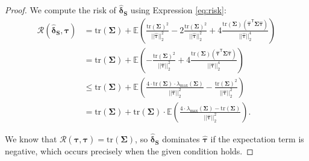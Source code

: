 \documentclass{article}
\newcommand{\bsSigma}{\boldsymbol \Sigma}
\newcommand{\bstau}{\boldsymbol \tau}
\newcommand{\hbstau}{\boldsymbol{\hat \tau}}
\newcommand{\bsSig}{\boldsymbol  \Sigma}
\def\E{\mathbb{E}}
\newcommand{\Tr}{\text{tr}}
\newcommand{\bsdelts}{\boldsymbol {\hat \delta_S}}
\newcommand{\tran}{\mathsf{T}}
\newcommand{\lambdamax}{\lambda_{\text{max}}(\bsSig)}
\begin{document}
\begin{proof}
We compute the risk of $\bsdelts$ using Expression \ref{eq:risk}:
\begin{align*}
\mathcal{R}\left( \bsdelts, \bstau \right) 
&=  \Tr(\bsSigma) + \E \left( \frac{\Tr(\bsSig)^2}{|| \hbstau||_2^2} - 2\frac{\Tr(\bsSig)^2}{|| \hbstau||_2^2} + 4 \frac{\Tr(\bsSig) \left(\hbstau^ \tran \bsSig \hbstau \right)}{||\hbstau||_2^4}   \right) \\
&=  \Tr(\bsSigma) + \E \left( - \frac{\Tr(\bsSig)^2}{|| \hbstau||_2^2} + 4 \frac{\Tr(\bsSig) \left(\hbstau^ \tran \bsSig \hbstau \right)}{||\hbstau||_2^4}   \right) \\
&\leq  \Tr(\boldsymbol \Sigma) + \E \left( \frac{4\cdot \Tr(\bsSig) \cdot\lambdamax}{|| \hbstau||_2^2}  - \frac{\Tr(\boldsymbol \Sigma)^2 }{|| \hbstau||_2^2}  \right) \\
&=  \Tr(\boldsymbol \Sigma) + \Tr(\bsSig) \cdot \E \left( \frac{4 \cdot \lambdamax  - \Tr(\bsSigma)}{|| \hbstau||_2^2}    \right). 
\end{align*}

We know that $\mathcal{R}\left( \hbstau, \bstau \right) = \Tr(\bsSigma)$, so $\bsdelts$ dominates $\hbstau$ if the expectation term is negative, which occurs precisely when the given condition holds. 

\end{proof}
\end{document}
